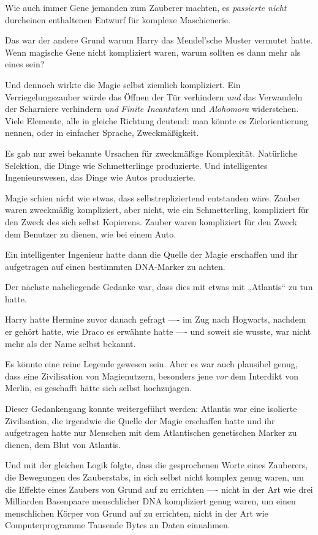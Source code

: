 {Wie auch immer Gene jemanden zum Zauberer machten, es \emph{passierte nicht} durcheinen enthaltenen Entwurf für komplexe Maschienerie.

Das war der andere Grund warum Harry das Mendel'sche Muster vermutet hatte. Wenn magische Gene nicht kompliziert waren, warum sollten es dann mehr als eines sein?

Und dennoch wirkte die Magie selbst ziemlich kompliziert. Ein Verriegelungszauber würde das Öffnen der Tür verhindern \emph{und} das Verwandeln der Scharniere verhindern \emph{und} \emph{Finite Incantatem} und \emph{Alohomora} widerstehen. Viele Elemente, alle in gleiche Richtung deutend: man könnte es Zielorientierung nennen, oder in einfacher Sprache, Zweckmäßigkeit.

Es gab nur zwei bekannte Ursachen für zweckmäßige Komplexität. Natürliche Selektion, die Dinge wie Schmetterlinge produzierte. Und intelligentes Ingenieurswesen, das Dinge wie Autos produzierte.

Magie schien nicht wie etwas, dass selbstrepliziertend entstanden wäre. Zauber waren zweckmäßig kompliziert, aber nicht, wie ein Schmetterling, kompliziert für den Zweck des sich selbst Kopierens. Zauber waren kompliziert für den Zweck dem Benutzer zu dienen, wie bei einem Auto.

Ein intelligenter Ingenieur hatte dann die Quelle der Magie erschaffen und ihr aufgetragen auf einen bestimmten DNA-Marker zu achten.

Der nächste naheliegende Gedanke war, dass dies mit etwas mit „Atlantis“ zu tun hatte.

Harry hatte Hermine zuvor danach gefragt ---- im Zug nach Hogwarts, nachdem er gehört hatte, wie Draco es erwähnte hatte ---- und soweit sie wusste, war nicht mehr als der Name selbst bekannt.

Es könnte eine reine Legende gewesen sein. Aber es war auch plausibel genug, dass eine Zivilisation von Magienutzern, besonders jene \emph{vor} dem Interdikt von Merlin, es geschafft hätte sich selbst hochzujagen.

Dieser Gedankengang konnte weitergeführt werden: Atlantis war eine isolierte Zivilisation, die irgendwie die Quelle der Magie erschaffen hatte und ihr aufgetragen hatte nur Menschen mit dem Atlantischen genetischen Marker zu dienen, dem Blut von Atlantis.

Und mit der gleichen Logik folgte, dass die gesprochenen Worte eines Zauberers, die Bewegungen des Zauberstabs, in sich selbst nicht komplex genug waren, um die Effekte eines Zaubers von Grund auf zu errichten ---- nicht in der Art wie drei Milliarden Basenpaare menschlicher DNA kompliziert genug waren, um einen menschlichen Körper von Grund auf zu errichten, nicht in der Art wie Computerprogramme Tausende Bytes an Daten einnahmen.

}

